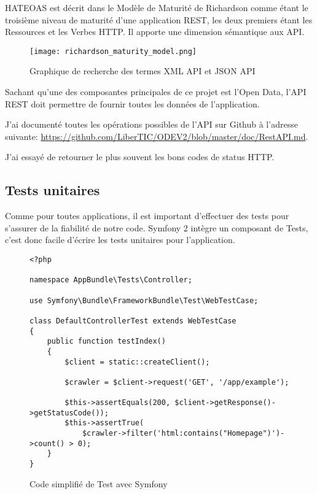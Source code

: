HATEOAS est décrit dans le Modèle de Maturité de Richardson  comme étant le troisième niveau de maturité d'une application REST, les deux premiers étant les Ressources et les Verbes HTTP. Il apporte une dimension sémantique aux API.

\begin{figure}[H]
\begin{center}
\texttt{[image: richardson\_maturity\_model.png]}
\end{center}
\caption{Graphique de recherche des termes XML API et JSON API}
\end{figure}

Sachant qu'une des composantes principales de ce projet est l'Open Data, l'API REST doit permettre de fournir toutes les données de l'application.

J'ai documenté toutes les opérations possibles de l'API sur Github à l'adresse suivante: \url{https://github.com/LiberTIC/ODEV2/blob/master/doc/RestAPI.md}.

J'ai essayé de retourner le plus souvent les bons codes de status HTTP.

\subsection{Tests unitaires}

Comme pour toutes applications, il est important d'effectuer des tests pour s'assurer de la fiabilité de notre code. Symfony 2 intègre un composant de Tests, c'est donc facile d'écrire les tests unitaires pour l'application.

\begin{figure}[H]
\begin{lstlisting}[frame=single]
<?php

namespace AppBundle\Tests\Controller;

use Symfony\Bundle\FrameworkBundle\Test\WebTestCase;

class DefaultControllerTest extends WebTestCase
{
    public function testIndex()
    {
        $client = static::createClient();

        $crawler = $client->request('GET', '/app/example');

        $this->assertEquals(200, $client->getResponse()->getStatusCode());
        $this->assertTrue(
            $crawler->filter('html:contains("Homepage")')->count() > 0);
    }
}

\end{lstlisting}
\caption{Code simplifié de Test avec Symfony}
\end{figure}

